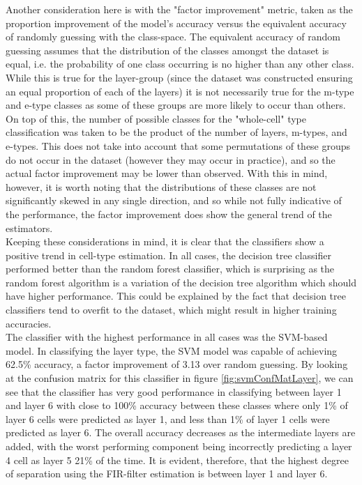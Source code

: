 \documentclass[letterpaper, 10 pt, conference]{ieeeconf}  %
\begin{document}
Another consideration here is with the "factor improvement" metric, taken as the proportion improvement of the model's accuracy versus the equivalent accuracy of randomly guessing with the class-space. The equivalent accuracy of random guessing assumes that the distribution of the classes amongst the dataset is equal, i.e. the probability of one class occurring is no higher than any other class. While this is true for the layer-group (since the dataset was constructed ensuring an equal proportion of each of the layers) it is not necessarily true for the m-type and e-type classes as some of these groups are more likely to occur than others. On top of this, the number of possible classes for the "whole-cell" type classification was taken to be the product of the number of layers, m-types, and e-types. This does not take into account that some permutations of these groups do not occur in the dataset (however they may occur in practice), and so the actual factor improvement may be lower than observed. With this in mind, however, it is worth noting that the distributions of these classes are not significantly skewed in any single direction, and so while not fully indicative of the performance, the factor improvement does show the general trend of the estimators.\\
Keeping these considerations in mind, it is clear that the classifiers show a positive trend in cell-type estimation. In all cases, the decision tree classifier performed better than the random forest classifier, which is surprising as the random forest algorithm is a variation of the decision tree algorithm which should have higher performance. This could be explained by the fact that decision tree classifiers tend to overfit to the dataset, which might result in higher training accuracies.\\
The classifier with the highest performance in all cases was the SVM-based model. In classifying the layer type, the SVM model was capable of achieving 62.5\% accuracy, a factor improvement of 3.13 over random guessing. By looking at the confusion matrix for this classifier in figure \ref{fig:svmConfMatLayer}, we can see that the classifier has very good performance in classifying between layer 1 and layer 6 with close to 100\% accuracy between these classes where only 1\% of layer 6 cells were predicted as layer 1, and less than 1\% of layer 1 cells were predicted as layer 6. The overall accuracy decreases as the intermediate layers are added, with the worst performing component being incorrectly predicting a layer 4 cell as layer 5 21\% of the time. It is evident, therefore, that the highest degree of separation using the FIR-filter estimation is between layer 1 and layer 6.\\
\end{document}

